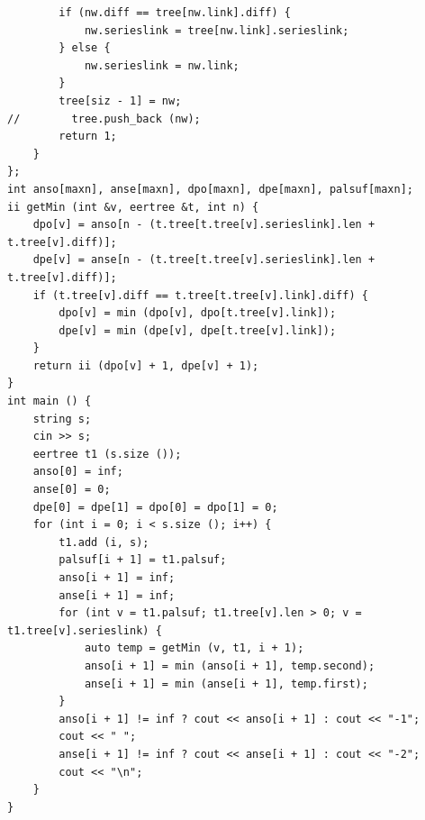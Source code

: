 \documentclass[8pt, a4paper, oneside, twocolumn]{extarticle}
\begin{document}
\begin{verbatim}
        if (nw.diff == tree[nw.link].diff) {
            nw.serieslink = tree[nw.link].serieslink;
        } else {
            nw.serieslink = nw.link;
        }
        tree[siz - 1] = nw;
//        tree.push_back (nw);
        return 1;
    }
};
int anso[maxn], anse[maxn], dpo[maxn], dpe[maxn], palsuf[maxn];
ii getMin (int &v, eertree &t, int n) {
    dpo[v] = anso[n - (t.tree[t.tree[v].serieslink].len + t.tree[v].diff)];
    dpe[v] = anse[n - (t.tree[t.tree[v].serieslink].len + t.tree[v].diff)];
    if (t.tree[v].diff == t.tree[t.tree[v].link].diff) {
        dpo[v] = min (dpo[v], dpo[t.tree[v].link]);
        dpe[v] = min (dpe[v], dpe[t.tree[v].link]);
    }
    return ii (dpo[v] + 1, dpe[v] + 1);
}
int main () {
    string s;
    cin >> s;
    eertree t1 (s.size ());
    anso[0] = inf;
    anse[0] = 0;
    dpe[0] = dpe[1] = dpo[0] = dpo[1] = 0;
    for (int i = 0; i < s.size (); i++) {
        t1.add (i, s);
        palsuf[i + 1] = t1.palsuf;
        anso[i + 1] = inf;
        anse[i + 1] = inf;
        for (int v = t1.palsuf; t1.tree[v].len > 0; v = t1.tree[v].serieslink) {
            auto temp = getMin (v, t1, i + 1);
            anso[i + 1] = min (anso[i + 1], temp.second);
            anse[i + 1] = min (anse[i + 1], temp.first);
        }
        anso[i + 1] != inf ? cout << anso[i + 1] : cout << "-1";
        cout << " ";
        anse[i + 1] != inf ? cout << anse[i + 1] : cout << "-2";
        cout << "\n";
    }
}
\end{verbatim}
\end{document}
